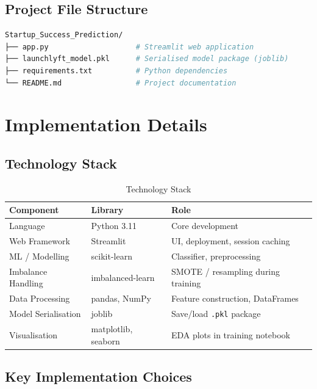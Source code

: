 \documentclass[12pt,a4paper]{article}
\begin{document}
\subsection{Project File Structure}

\begin{lstlisting}[language=bash, caption={Project directory structure}]
Startup_Success_Prediction/
├── app.py                    # Streamlit web application
├── launchlyft_model.pkl      # Serialised model package (joblib)
├── requirements.txt          # Python dependencies
└── README.md                 # Project documentation
\end{lstlisting}

\section{Implementation Details}

\subsection{Technology Stack}

\begin{table}[H]
\centering
\caption{Technology Stack}
\begin{tabular}{lll}
\toprule
\textbf{Component}    & \textbf{Library}    & \textbf{Role} \\
\midrule
Language              & Python 3.11         & Core development \\
Web Framework         & Streamlit           & UI, deployment, session caching \\
ML / Modelling        & scikit-learn        & Classifier, preprocessing \\
Imbalance Handling    & imbalanced-learn    & SMOTE / resampling during training \\
Data Processing       & pandas, NumPy       & Feature construction, DataFrames \\
Model Serialisation   & joblib              & Save/load \texttt{.pkl} package \\
Visualisation         & matplotlib, seaborn & EDA plots in training notebook \\
\bottomrule
\end{tabular}
\end{table}

\subsection{Key Implementation Choices}
\end{document}
